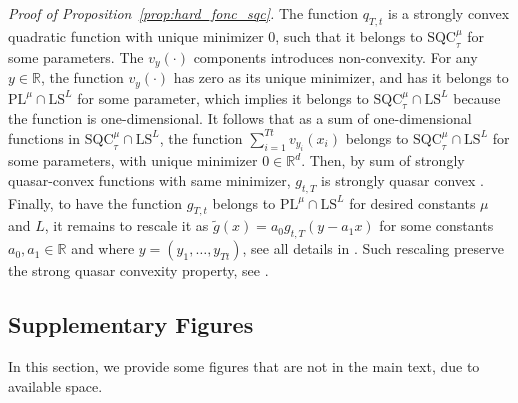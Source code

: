 \documentclass{article}
\def\R{{\mathbb{R}}}
\def\pl{{\text{PL}^\mu}}
\newcommand{\sqc}{\text{SQC}_{\tau}^{\mu}}
\newcommand{\ls}{\text{LS}^{L}}
\theoremstyle{plain}
\theoremstyle{definition}
\theoremstyle{remark}
\begin{document}
\textit{Proof of Proposition~\ref{prop:hard_fonc_sqc}.}
 The function $q_{T,t}$ is a strongly convex quadratic function with unique minimizer $0$, such that it belongs to $\sqc$ for some parameters. The $v_y(\cdot )$ components introduces non-convexity.  For any $y\in \R$, the function $v_y(\cdot)$ has zero as its unique minimizer, and has it belongs to $\pl \cap \ls$ for some parameter, which implies it belongs to $\sqc \cap \ls $ because the function is one-dimensional. It follows that as a sum of one-dimensional functions in $\sqc \cap \ls$, the function $ \sum_{i=1}^{Tt}v_{y_i}(x_i)$ belongs to $\sqc \cap \ls$ for some parameters, with unique minimizer $0 \in \R^d$. Then, by sum of strongly quasar-convex functions with same minimizer, $g_{t,T}$ is strongly quasar convex \cite[Appendix D.3]{hinder2020near}. Finally, to have the function $g_{T,t}$ belongs to $\pl \cap \ls$ for desired constants $\mu$ and $L$, it remains to rescale it as $\tilde g(x) = a_0g_{t,T}(y-a_1x)$ for some constants $a_0,a_1 \in \R$ and where $y = (y_1,\dots,y_{Tt})$, see all details in \cite{PLlowerbound}. Such rescaling preserve the strong quasar convexity property, see \cite[Appendix D.3]{hinder2020near}. 

\subsection{Supplementary Figures}
In this section, we provide some figures that are not in the main text, due to available space. 
\end{document}
